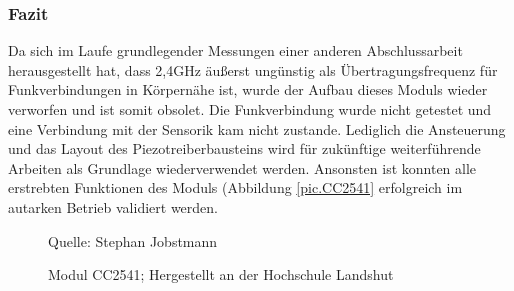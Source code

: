 \documentclass[12pt]{scrreprt} %
\begin{document}
\subsubsection{Fazit}
Da sich im Laufe grundlegender Messungen einer anderen Abschlussarbeit herausgestellt hat, dass 2,4GHz äußerst ungünstig als Übertragungsfrequenz für Funkverbindungen in Körpernähe ist, wurde der Aufbau dieses Moduls wieder verworfen und ist somit obsolet. Die Funkverbindung wurde nicht getestet und eine Verbindung mit der Sensorik kam nicht zustande. Lediglich die Ansteuerung und das Layout des Piezotreiberbausteins  wird für zukünftige weiterführende Arbeiten als Grundlage wiederverwendet werden. Ansonsten ist konnten alle erstrebten Funktionen des Moduls (Abbildung \vref{pic.CC2541} erfolgreich im autarken Betrieb validiert werden.
\begin{figure}
\centering
\caption{Modul CC2541; Hergestellt an der Hochschule Landshut}
Quelle: Stephan Jobstmann
\label{pic.CC2541}
\end{figure}
\end{document}
